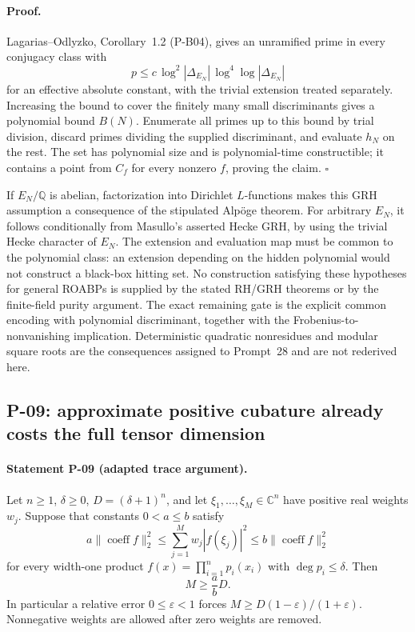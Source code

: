 \documentclass[11pt,a4paper]{article}
\theoremstyle{definition}\newtheorem{definition}{Definition}
\begin{document}
\paragraph{Proof.}
Lagarias--Odlyzko, Corollary~1.2 (P-B04), gives an unramified prime in every conjugacy class with
\[
 p\le c\,\log^2|\Delta_{E_N}|\,\log^4\log|\Delta_{E_N}|
\]
for an effective absolute constant, with the trivial extension treated separately. Increasing the bound to cover the finitely many small discriminants gives a polynomial bound $B(N)$. Enumerate all primes up to this bound by trial division, discard primes dividing the supplied discriminant, and evaluate $h_N$ on the rest. The set has polynomial size and is polynomial-time constructible; it contains a point from $C_f$ for every nonzero $f$, proving the claim. $\square$

If $E_N/\mathbb Q$ is abelian, factorization into Dirichlet $L$-functions makes this GRH assumption a consequence of the stipulated Alp\"oge theorem. For arbitrary $E_N$, it follows conditionally from Masullo's asserted Hecke GRH, by using the trivial Hecke character of $E_N$. The extension and evaluation map must be common to the polynomial class: an extension depending on the hidden polynomial would not construct a black-box hitting set. No construction satisfying these hypotheses for general ROABPs is supplied by the stated RH/GRH theorems or by the finite-field purity argument. The exact remaining gate is the explicit common encoding with polynomial discriminant, together with the Frobenius-to-nonvanishing implication. Deterministic quadratic nonresidues and modular square roots are the consequences assigned to Prompt~28 and are not rederived here.

\subsection{P-09: approximate positive cubature already costs the full tensor dimension}
\paragraph{Statement P-09 (adapted trace argument).}
Let $n\ge1$, $\delta\ge0$, $D=(\delta+1)^n$, and let $\xi_1,\ldots,\xi_M\in\mathbb C^n$ have positive real weights $w_j$. Suppose that constants $0<a\le b$ satisfy
\[
 a\|\operatorname{coeff} f\|_2^2
 \le \sum_{j=1}^M w_j|f(\xi_j)|^2
 \le b\|\operatorname{coeff} f\|_2^2
 \tag{P09.1}
\]
for every width-one product $f(x)=\prod_{i=1}^n p_i(x_i)$ with $\deg p_i\le\delta$. Then
\[
 M\ge \frac{a}{b}D.
 \tag{P09.2}
\]
In particular a relative error $0\le\varepsilon<1$ forces
$M\ge D(1-\varepsilon)/(1+\varepsilon)$. Nonnegative weights are allowed after zero weights are removed.
\end{document}
